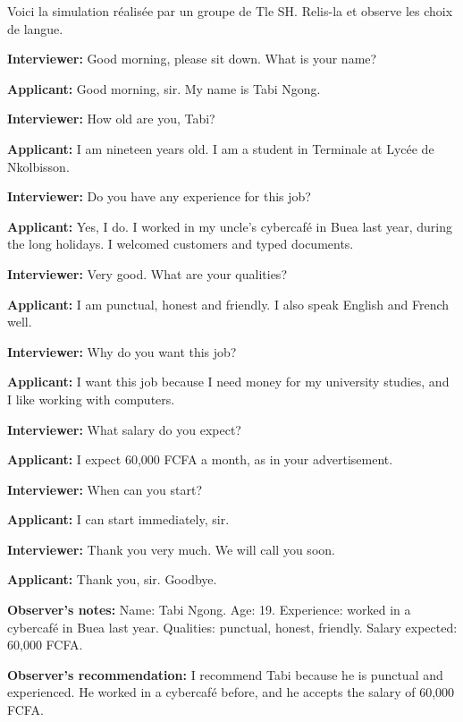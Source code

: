 \documentclass[11pt]{article}
\begin{document}
\begin{exoresolu}
Voici la simulation réalisée par un groupe de Tle SH. Relis-la et observe les choix de langue.

\textbf{Interviewer:} Good morning, please sit down. What is your name?

\textbf{Applicant:} Good morning, sir. My name is Tabi Ngong.

\textbf{Interviewer:} How old are you, Tabi?

\textbf{Applicant:} I am nineteen years old. I am a student in Terminale at Lycée de Nkolbisson.

\textbf{Interviewer:} Do you have any experience for this job?

\textbf{Applicant:} Yes, I do. I worked in my uncle's cybercafé in Buea last year, during the long holidays. I welcomed customers and typed documents.

\textbf{Interviewer:} Very good. What are your qualities?

\textbf{Applicant:} I am punctual, honest and friendly. I also speak English and French well.

\textbf{Interviewer:} Why do you want this job?

\textbf{Applicant:} I want this job because I need money for my university studies, and I like working with computers.

\textbf{Interviewer:} What salary do you expect?

\textbf{Applicant:} I expect 60,000 FCFA a month, as in your advertisement.

\textbf{Interviewer:} When can you start?

\textbf{Applicant:} I can start immediately, sir.

\textbf{Interviewer:} Thank you very much. We will call you soon.

\textbf{Applicant:} Thank you, sir. Goodbye.

\textbf{Observer's notes:} Name: Tabi Ngong. Age: 19. Experience: worked in a cybercafé in Buea last year. Qualities: punctual, honest, friendly. Salary expected: 60,000 FCFA.

\textbf{Observer's recommendation:} I recommend Tabi because he is punctual and experienced. He worked in a cybercafé before, and he accepts the salary of 60,000 FCFA.

\tcblower


\end{exoresolu}
\end{document}
